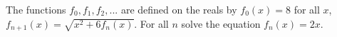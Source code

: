 The functions $f_0, f_1, f_2, ...$ are defined on the reals by $f_0(x) = 8$ for all $x$, $f_{n+1}(x) = \sqrt{x^2 + 6f_n(x)}$. For all $n$ solve the equation $f_n(x) = 2x$.